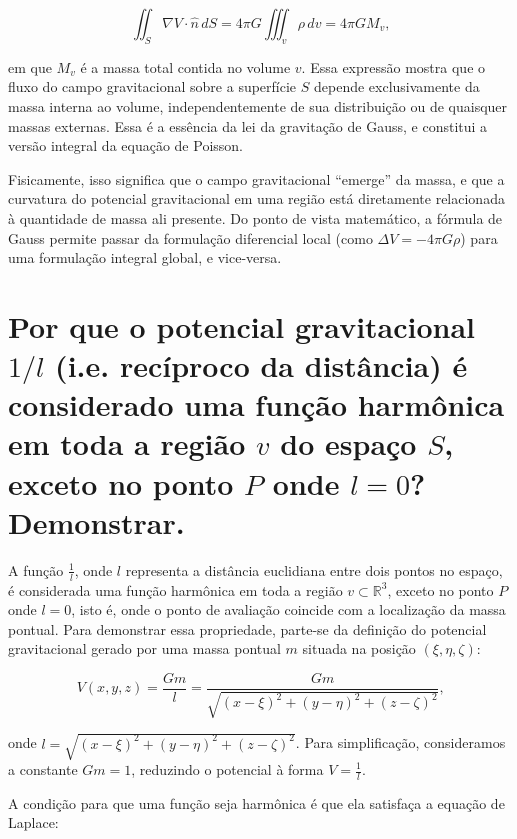 \[
\iint_S \nabla V \cdot \hat{n} \, dS = 4\pi G \iiint_v \rho \, dv = 4\pi G M_v \text{,}
\]

\noindent
em que \( M_v \) é a massa total contida no volume \( v \). Essa expressão mostra que o fluxo do campo gravitacional sobre a superfície \( S \) depende exclusivamente da massa interna ao volume, independentemente de sua distribuição ou de quaisquer massas externas. Essa é a essência da lei da gravitação de Gauss, e constitui a versão integral da equação de Poisson.

Fisicamente, isso significa que o campo gravitacional “emerge” da massa, e que a curvatura do potencial gravitacional em uma região está diretamente relacionada à quantidade de massa ali presente. Do ponto de vista matemático, a fórmula de Gauss permite passar da formulação diferencial local (como \( \Delta V = -4\pi G \rho \)) para uma formulação integral global, e vice-versa. 



\section{Por que o potencial gravitacional $1/l$ (i.e. recíproco da distância) é considerado uma função harmônica em toda a região $v$ do espaço $S$, exceto no ponto $P$ onde $l=0$? Demonstrar.}


A função \( \frac{1}{l} \), onde \( l \) representa a distância euclidiana entre dois pontos no espaço, é considerada uma função harmônica em toda a região \( v \subset \mathbb{R}^3 \), exceto no ponto \( P \) onde \( l = 0 \), isto é, onde o ponto de avaliação coincide com a localização da massa pontual. Para demonstrar essa propriedade, parte-se da definição do potencial gravitacional gerado por uma massa pontual \( m \) situada na posição \( (\xi, \eta, \zeta) \):

\[
V(x, y, z) = \frac{Gm}{l} = \frac{Gm}{\sqrt{(x - \xi)^2 + (y - \eta)^2 + (z - \zeta)^2}} \text{,}
\]

\noindent
onde \( l = \sqrt{(x - \xi)^2 + (y - \eta)^2 + (z - \zeta)^2} \). Para simplificação, consideramos a constante \( Gm = 1 \), reduzindo o potencial à forma \( V = \frac{1}{l} \).

A condição para que uma função seja harmônica é que ela satisfaça a equação de Laplace:

